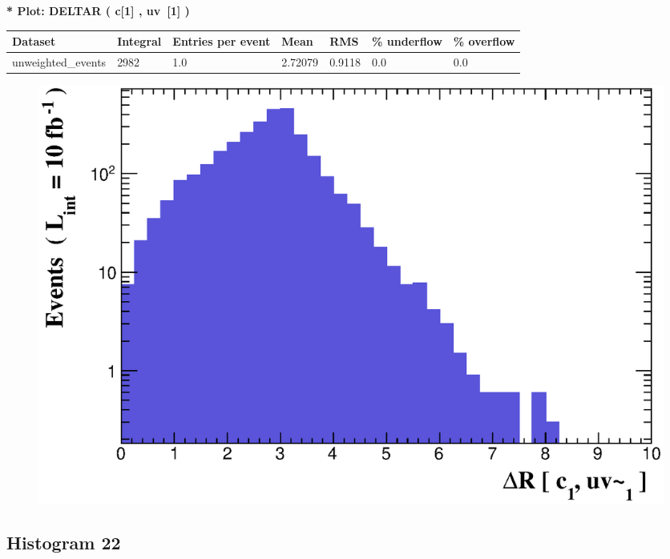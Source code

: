 \documentclass[a4paper, 10pt]{article}
\begin{document}
\textbf{* Plot: DELTAR ( c[1] , uv~[1] ) }\\
   \begin{table}[H]
  \begin{center}
    \begin{tabular}{|m{23.0mm}|m{23.0mm}|m{18.0mm}|m{19.0mm}|m{19.0mm}|m{19.0mm}|m{19.0mm}|}
      \hline
      {\cellcolor{yellow}         Dataset}& {\cellcolor{yellow}         Integral}& {\cellcolor{yellow}         Entries per event}& {\cellcolor{yellow}         Mean}& {\cellcolor{yellow}         RMS}& {\cellcolor{yellow}         \% underflow}& {\cellcolor{yellow}         \% overflow}\\
      \hline
      {\cellcolor{white}         unweighted\_events}& {\cellcolor{white}         2982}& {\cellcolor{white}         1.0}& {\cellcolor{white}         2.72079}& {\cellcolor{white}         0.9118}& {\cellcolor{green}         0.0}& {\cellcolor{green}         0.0}\\
\hline
    \end{tabular}
  \end{center}
\end{table}

\begin{figure}[H]
  \begin{center}
    \includegraphics[scale=0.45]{selection_20.eps}\\
\caption{   }
  \end{center}
\end{figure}
      \newpage
\subsection{ Histogram 22}
\end{document}
